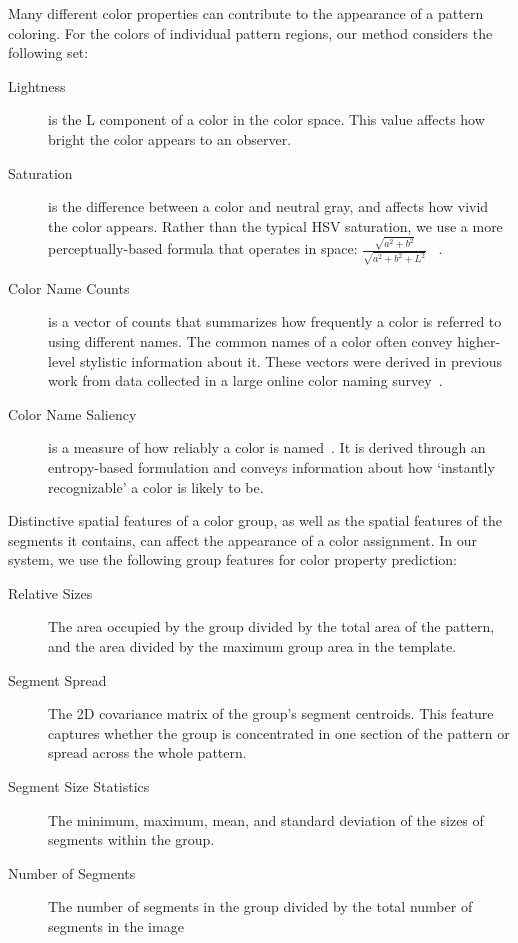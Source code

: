 Many different color properties can contribute to the appearance of a pattern coloring. For the colors of individual pattern regions, our method considers the following set:
\begin{description}
	\item[Lightness] is the L component of a color in the \lab color space. This value affects how bright the color appears to an observer.
	\item[Saturation] is the difference between a color and neutral gray, and affects how vivid the color appears. Rather than the typical HSV saturation, we use a more perceptually-based formula that operates in \lab space: $\frac{\sqrt{a^2+b^2}}{\sqrt{a^2+b^2+L^2}}$ ~\cite{ColorfulnessReference}.
	\item[Color Name Counts] is a vector of counts that summarizes how frequently a color is referred to using different names. The common names of a color often convey higher-level stylistic information about it. These vectors were derived in previous work from data collected in a large online color naming survey~\cite{ColorNamingModels}.
	\item[Color Name Saliency] is a measure of how reliably a color is named~\cite{ColorNamingModels}. It is derived through an entropy-based formulation and conveys information about how `instantly recognizable' a color is likely to be.
\end{description}
%
%
Distinctive spatial features of a color group, as well as the spatial features of the segments it contains, can affect the appearance of a color assignment. In our system, we use the following group features for color property prediction:
\begin{description}
	\item[Relative Sizes] The area occupied by the group divided by the total area of the pattern, and the area divided by the maximum group area in the template.
  \item[Segment Spread] The 2D covariance matrix of the group's segment centroids. This feature captures whether the group is concentrated in one section of the pattern or spread across the whole pattern.
  \item[Segment Size Statistics] The minimum, maximum, mean, and standard deviation of the sizes of segments within the group.
  \item[Number of Segments] The number of segments in the group divided by the total number of segments in the image
\end{description}
